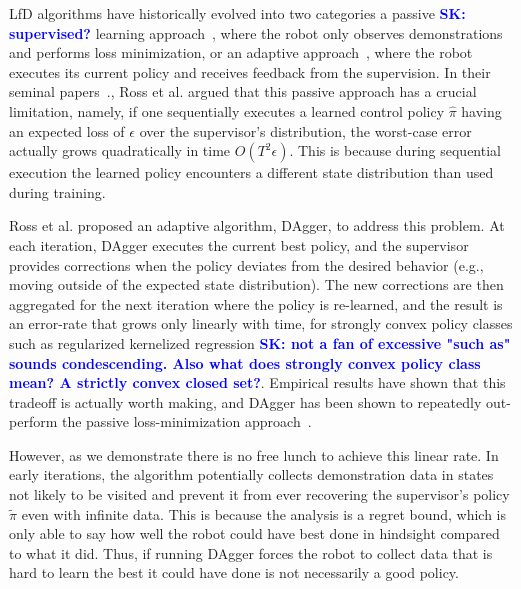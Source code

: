 \documentclass[10pt, conference]{ieeeconf}      %
\newcommand{\sknote}[1]{\ifthenelse{ \boolean{include-notes}}%
 {\textcolor{blue}{\textbf{SK: #1}}}{}}
\begin{document}
LfD algorithms have historically evolved into two categories a passive \sknote{supervised?} learning approach~\cite{pomerleau1989alvinn}, where the robot only observes demonstrations and performs loss minimization, or an adaptive approach~\cite{ross2010reduction}, where the robot executes its current policy and receives feedback from the supervision. In their seminal papers~\cite{ross2010efficient,ross2010reduction,ross2013learning}., Ross et al. argued that this passive approach has a crucial limitation, namely,  if one sequentially executes a learned control policy $\hat{\pi}$ having an expected loss of $\epsilon$ over the supervisor's distribution, the worst-case error actually grows quadratically in time $O(T^2\epsilon)$. This is because during sequential execution the learned policy encounters a different state distribution than used during training.

Ross et al. proposed an adaptive algorithm, DAgger, to address this problem.  At each iteration, DAgger executes the current best policy, and the supervisor provides corrections when the policy deviates from the desired behavior (e.g., moving outside of the expected state distribution). The new corrections are then aggregated for the next iteration where the policy is re-learned, and the result is an error-rate that grows only linearly with time, for strongly convex policy classes such as regularized kernelized regression \sknote{not a fan of excessive "such as" sounds condescending. Also what does strongly convex policy class mean? A strictly convex closed set?}. Empirical results have shown that this tradeoff is actually worth making,  and DAgger has been shown to repeatedly out-perform the passive loss-minimization approach~\cite{ross2010efficient,ross2010reduction,ross2013learning}.

However, as we demonstrate there is no free lunch to achieve this linear rate. In early iterations, the algorithm potentially collects demonstration data in states not likely to be visited and prevent it from ever  recovering the supervisor's policy $\tilde{\pi}$ even with infinite data. This is because the analysis is a regret bound, which is only able to say how well the robot could have best done in hindsight compared to what it did. Thus, if running DAgger forces the robot to collect data that is hard to learn the best it could have done is not necessarily a good policy. 
\end{document}
